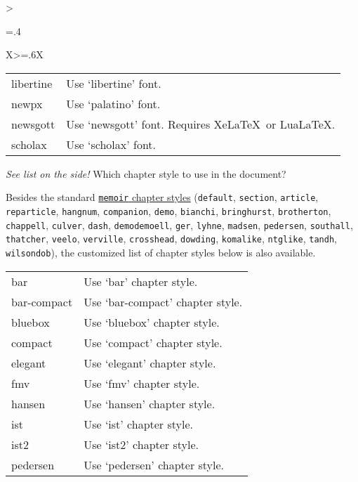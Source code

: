 \begin{xltabular}{\linewidth}{>{\hsize=.4\hsize\raggedright\arraybackslash}X>{\hsize=.6\hsize}X}
{\begin{tabular}{@{}l@{ $\rightarrow$ }X@{}}
      libertine   & Use `libertine' font.                                 \\
      newpx       & Use `palatino' font.                        \\
      newsgott    & Use `newsgott' font. Requires Xe\LaTeX\ or Lua\LaTeX. \\
      scholax     & Use `scholax' font.                                   \\
    \end{tabular}
  }
  \midrule
  {\emph{See list on the side!}}%
  {Which chapter style to use in the document?}%
  {%
    Besides the standard \href{https://tug.ctan.org/info/MemoirChapStyles/MemoirChapStyles.pdf}{\texttt{memoir} chapter styles} (\texttt{default}, \texttt{section}, \texttt{article}, \texttt{reparticle}, \texttt{hangnum}, \texttt{companion}, \texttt{demo}, \texttt{bianchi}, \texttt{bringhurst}, \texttt{brotherton}, \texttt{chappell}, \texttt{culver}, \texttt{dash}, \texttt{demodemoell}, \texttt{ger}, \texttt{lyhne}, \texttt{madsen}, \texttt{pedersen}, \texttt{southall}, \texttt{thatcher}, \texttt{veelo}, \texttt{verville}, \texttt{crosshead}, \texttt{dowding}, \texttt{komalike}, \texttt{ntglike}, \texttt{tandh}, \texttt{wilsondob}), the customized list of chapter styles below is also available.
    \begin{tabular}{@{}l@{ $\rightarrow$ }X@{}}
      bar         & Use `bar' chapter style.  \\
      bar-compact & Use `bar-compact' chapter style.    \\
      bluebox     & Use `bluebox' chapter style.        \\
      compact     & Use `compact' chapter style.        \\
      elegant     & Use `elegant' chapter style.        \\
      fmv         & Use `fmv' chapter style.            \\
      hansen      & Use `hansen' chapter style.         \\
      ist         & Use `ist' chapter style.            \\
      ist2        & Use `ist2' chapter style.           \\
      pedersen    & Use `pedersen' chapter style.       \\
    \end{tabular}
  }

\end{xltabular}
